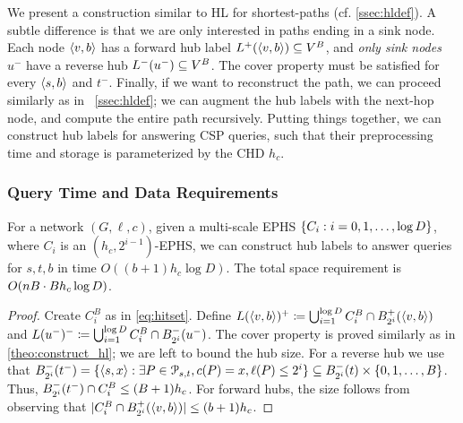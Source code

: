 We present a construction similar to HL for shortest-paths (cf. \cref{ssec:hldef}).
A subtle difference is that we are only interested in paths ending in a sink node.
Each node $\pp{v,b}$ has a forward hub label $\Lf(\pp{v,b})\subseteq V^B$, and \emph{only sink nodes} $u^-$ have a reverse hub $\Lb(u^-)\subseteq V^B$.
The cover property must be satisfied for every $\pp{s,b}$ and $t^-$.
Finally, if we want to reconstruct the path, we can proceed similarly as in ~\cref{ssec:hldef}; we can augment the hub labels with the next-hop node, and compute the entire path recursively.
Putting things together, we can construct hub labels for answering CSP queries, such that their preprocessing time and storage is parameterized by the CHD $h_c$.

\subsubsection{Query Time and Data Requirements}

\begin{theorem}
\label{theo:HLeff}
For a network $(G,\ell,c)$, given a multi-scale EPHS $\crl*{C_i:i=0,1,\ldots,\log D}$, where $C_i$ is an $(h_c,2^{i-1})$-EPHS, we can construct hub labels 
to answer queries for $s,t,b$ in time $O((b+1) h_c\log D)$.
The total space requirement is $\Or(nB \cdot Bh_c\log D)$.
\end{theorem}
\begin{proof}
Create $C_i^B$ as in \cref{eq:hitset}.
Define $L(\pp{v,b})^+ \defeq \bigcup_{i=1}^{\log D} C_i^B\cap \Bf_{2^i}(\pp{v,b})$ and $L(u^-)^-  \defeq \bigcup_{i=1}^{\log D} C_i^B\cap \Bb_{2^i}(u^-)$.
The cover property is proved similarly as in \cref{theo:construct_hl}; we are left to bound the hub size.
For a reverse hub we use that $\Bb_{2^i}(t^-) = \{\pp{s,x}: \exists P\in \Pst, c(P)=x, \ell(P)\leq 2^i\}
\subseteq \Bb_{2^i}(t)\times \{0,1,\ldots,B\}$.
Thus, $\Bb_{2^i}(t^-)\cap C_i^B\leq (B+1)h_c$.
For forward hubs, the size follows from observing that $ \card{C_i^B\cap \Bf_{2^i}(\pp{v,b})}\leq (b+1)h_c$.
\end{proof}
